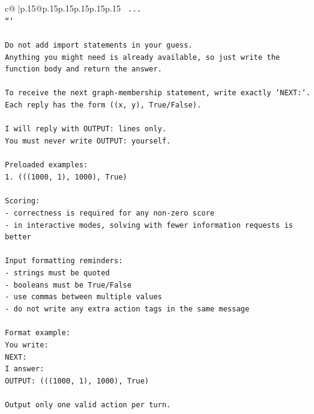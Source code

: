 \documentclass{article}
\begin{document}
{\begin{supertabular}{c@{$\;$}|p{.15\linewidth}@{}p{.15\linewidth}p{.15\linewidth}p{.15\linewidth}p{.15\linewidth}p{.15\linewidth}}
{{{\texttt{    ...} \\
\texttt{```} \\
\\ 
\texttt{Do not add import statements in your guess.} \\
\texttt{Anything you might need is already available, so just write the function body and return the answer.} \\
\\ 
\texttt{To receive the next graph{-}membership statement, write exactly `NEXT:`.} \\
\texttt{Each reply has the form ((x, y), True/False).} \\
\\ 
\texttt{I will reply with OUTPUT: lines only.} \\
\texttt{You must never write OUTPUT: yourself.} \\
\\ 
\texttt{Preloaded examples:} \\
\texttt{1. (((1000, 1), 1000), True)} \\
\\ 
\texttt{Scoring:} \\
\texttt{{-} correctness is required for any non{-}zero score} \\
\texttt{{-} in interactive modes, solving with fewer information requests is better} \\
\\ 
\texttt{Input formatting reminders:} \\
\texttt{{-} strings must be quoted} \\
\texttt{{-} booleans must be True/False} \\
\texttt{{-} use commas between multiple values} \\
\texttt{{-} do not write any extra action tags in the same message} \\
\\ 
\texttt{Format example:} \\
\texttt{You write:} \\
\texttt{NEXT:} \\
\texttt{I answer:} \\
\texttt{OUTPUT: (((1000, 1), 1000), True)} \\
\\ 
\texttt{Output only one valid action per turn.} \\
            }
        }
    }
     \\ \\


\end{supertabular}}
\end{document}
